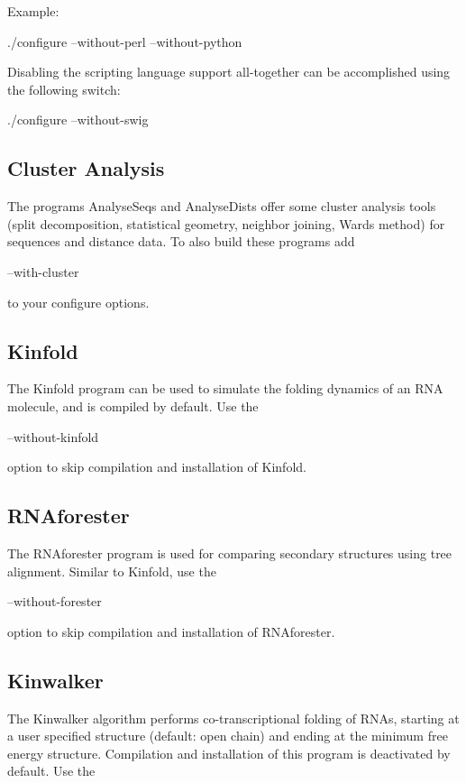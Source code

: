 Example\+:

\begin{DoxyVerb}./configure --without-perl --without-python
\end{DoxyVerb}


Disabling the scripting language support all-\/together can be accomplished using the following switch\+: \begin{DoxyVerb}./configure --without-swig
\end{DoxyVerb}
\hypertarget{install_config_cluster}{}\subsection{Cluster Analysis}\label{install_config_cluster}
The programs Analyse\+Seqs and Analyse\+Dists offer some cluster analysis tools (split decomposition, statistical geometry, neighbor joining, Ward\textquotesingle{}s method) for sequences and distance data. To also build these programs add

\begin{DoxyVerb}--with-cluster
\end{DoxyVerb}


to your configure options.\hypertarget{install_config_kinfold}{}\subsection{Kinfold}\label{install_config_kinfold}
The Kinfold program can be used to simulate the folding dynamics of an R\+NA molecule, and is compiled by default. Use the

\begin{DoxyVerb}--without-kinfold
\end{DoxyVerb}


option to skip compilation and installation of Kinfold.\hypertarget{install_config_forester}{}\subsection{R\+N\+Aforester}\label{install_config_forester}
The R\+N\+Aforester program is used for comparing secondary structures using tree alignment. Similar to Kinfold, use the

\begin{DoxyVerb}--without-forester
\end{DoxyVerb}


option to skip compilation and installation of R\+N\+Aforester.\hypertarget{install_config_kinwalker}{}\subsection{Kinwalker}\label{install_config_kinwalker}
The Kinwalker algorithm performs co-\/transcriptional folding of R\+N\+As, starting at a user specified structure (default\+: open chain) and ending at the minimum free energy structure. Compilation and installation of this program is deactivated by default. Use the

